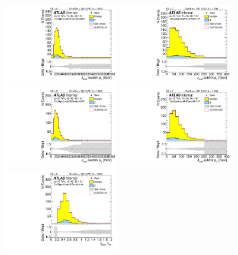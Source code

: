 \begin{figure}[htbp!]
\begin{center}
\includegraphics[angle=270, width=0.45\textwidth]{./figures/boosted/Signal/b77_ThreeTag_Signal_leadHCand_trk0_Pt_blind.pdf}
\includegraphics[angle=270, width=0.45\textwidth]{./figures/boosted/Signal/b77_ThreeTag_Signal_leadHCand_trk1_Pt_blind.pdf}\\
\includegraphics[angle=270, width=0.45\textwidth]{./figures/boosted/Signal/b77_ThreeTag_Signal_sublHCand_trk0_Pt_blind.pdf}
\includegraphics[angle=270, width=0.45\textwidth]{./figures/boosted/Signal/b77_ThreeTag_Signal_sublHCand_trk1_Pt_blind.pdf}\\
\includegraphics[angle=270, width=0.45\textwidth]{./figures/boosted/Signal/b77_ThreeTag_Signal_leadHCand_trk_dr_blind.pdf}

\end{center}
\end{figure}
